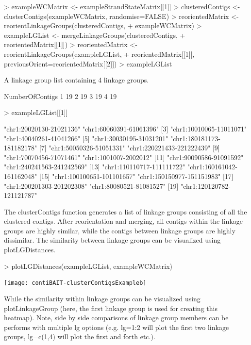 \documentclass{article}
\begin{document}
\begin{Schunk}
\begin{Sinput}
> exampleWCMatrix <- exampleStrandStateMatrix[[1]]
> clusteredContigs <- clusterContigs(exampleWCMatrix, randomise=FALSE)
> reorientedMatrix <- reorientLinkageGroups(clusteredContigs,
+  exampleWCMatrix)
> exampleLGList <- mergeLinkageGroups(clusteredContigs,
+ reorientedMatrix[[1]])
> reorientedMatrix <- reorientLinkageGroups(exampleLGList,
+  reorientedMatrix[[1]], previousOrient=reorientedMatrix[[2]])
> exampleLGList
\end{Sinput}
\begin{Soutput}
A linkage group list containing  4  linkage groups.

  NumberOfContigs
1              19
2              19
3              19
4              19
\end{Soutput}
\begin{Sinput}
> exampleLGList[[1]]
\end{Sinput}
\begin{Soutput}
 [1] "chr1:20020130-21021136"   "chr1:60060391-61061396"  
 [3] "chr1:10010065-11011071"   "chr1:40040261-41041266"  
 [5] "chr1:30030195-31031201"   "chr1:180181173-181182178"
 [7] "chr1:50050326-51051331"   "chr1:220221433-221222439"
 [9] "chr1:70070456-71071461"   "chr1:1001007-2002012"    
[11] "chr1:90090586-91091592"   "chr1:240241563-241242569"
[13] "chr1:110110717-111111722" "chr1:160161042-161162048"
[15] "chr1:100100651-101101657" "chr1:150150977-151151983"
[17] "chr1:200201303-201202308" "chr1:80080521-81081527"  
[19] "chr1:120120782-121121787"
\end{Soutput}
\end{Schunk}


The clusterContigs function generates a list of linkage groups consisting of all the clustered contigs.  After reorientation and merging, all contigs within the linkage groups are highly similar, while the contigs between linkage groups are highly dissimilar.  The similarity between linkage groups can be visualized using plotLGDistances.

\begin{Schunk}
\begin{Sinput}
> plotLGDistances(exampleLGList, exampleWCMatrix)
\end{Sinput}
\end{Schunk}
\texttt{[image: contiBAIT-clusterContigsExampleb]}


While the similarity within linkage groups can be visualized using plotLinkageGroup (here, the first linkage group is used for creating this heatmap). Note, side by side comparisons of linkage group members can be performs with multiple lg options (e.g. lg=1:2 will plot the first two linkage groups, lg=c(1,4) will plot the first and forth etc.).
\end{document}
